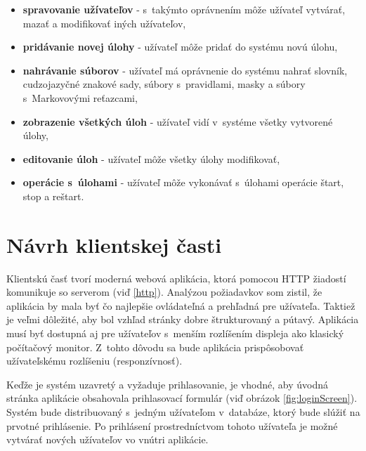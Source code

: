 \documentclass[zadani,slovak]{fitthesis}
\begin{document}
\begin{itemize}
    \item \textbf{spravovanie užívateľov} - s~takýmto oprávnením môže užívateľ vytvárať, mazať a modifikovať iných užívateľov,
    \item \textbf{pridávanie novej úlohy} - užívateľ môže pridať do systému novú úlohu,
    \item \textbf{nahrávanie súborov} - užívateľ má oprávnenie do systému nahrať slovník, cudzojazyčné znakové sady, súbory s~pravidlami, masky a súbory s~Markovovými reťazcami,
    \item \textbf{zobrazenie všetkých úloh} - užívateľ vidí v~systéme všetky vytvorené úlohy,
    \item \textbf{editovanie úloh} - užívateľ môže všetky úlohy modifikovať,
    \item \textbf{operácie s~úlohami} - užívateľ môže vykonávať s~úlohami operácie štart, stop a reštart.
\end{itemize}





\section{Návrh klientskej časti}\label{navrhKlient}
Klientskú časť tvorí moderná webová aplikácia, ktorá pomocou HTTP žiadostí komunikuje so serverom (viď \ref{http}). Analýzou požiadavkov som zistil, že aplikácia by mala byť čo najlepšie ovládateľná a prehľadná pre užívateľa. Taktiež je veľmi dôležité, aby bol vzhľad stránky dobre štrukturovaný a pútavý. Aplikácia musí byť dostupná aj pre užívateľov s~menším rozlíšením displeja ako klasický počítačový monitor. Z~tohto dôvodu sa bude aplikácia prispôsobovať užívateľskému rozlíšeniu (responzívnosť).

Keďže je systém uzavretý a vyžaduje prihlasovanie, je vhodné, aby úvodná stránka aplikácie obsahovala prihlasovací formulár (viď obrázok \ref{fig:loginScreen}). Systém bude distribuovaný s~jedným užívateľom v~databáze, ktorý bude slúžiť na prvotné prihlásenie. Po prihlásení prostredníctvom tohoto užívateľa je možné vytvárať nových užívateľov vo vnútri aplikácie.
\end{document}
